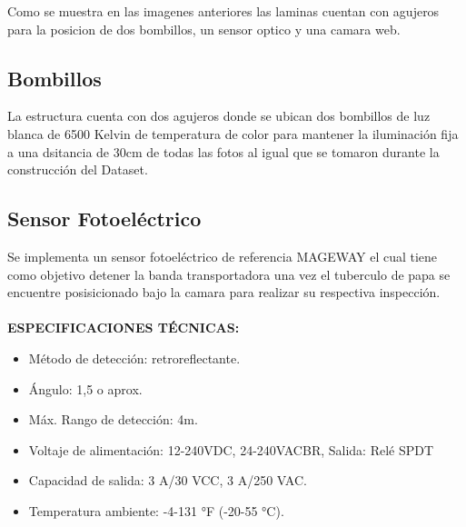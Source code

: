 		Como se muestra en las imagenes anteriores las laminas cuentan con agujeros para la posicion de dos bombillos, un sensor optico y una camara web.
		\subsection{Bombillos}
			La estructura cuenta con dos agujeros donde se ubican dos bombillos de luz blanca de 6500 Kelvin de temperatura de color para mantener la iluminación fija a una dsitancia de 30cm de todas las fotos al igual que se tomaron durante la construcción del Dataset.
		\subsection{Sensor Fotoeléctrico}
			Se implementa un sensor fotoeléctrico de referencia MAGEWAY el cual tiene como objetivo detener la banda transportadora una vez el tuberculo de papa se encuentre posisicionado bajo la camara para realizar su respectiva inspección.
			\\
			\\
			\textbf{ESPECIFICACIONES TÉCNICAS:}
				\begin{itemize}
					\item Método de detección: retroreflectante.
					\item Ángulo: 1,5 o aprox.
					\item Máx. Rango de detección: 4m.
					\item Voltaje de alimentación: 12-240VDC, 24-240VACBR, Salida: Relé SPDT
					\item Capacidad de salida: 3 A/30 VCC, 3 A/250 VAC.
					\item Temperatura ambiente: -4-131 °F (-20-55 °C).
				\end{itemize}
\newpage			
